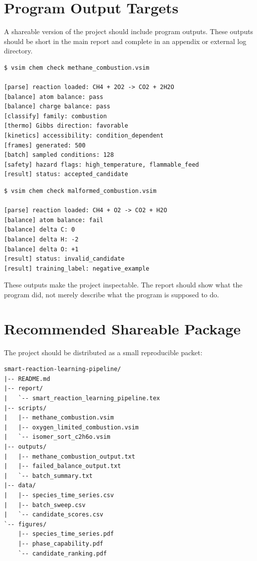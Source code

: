 \documentclass[11pt]{article}
\begin{document}
\section{Program Output Targets}

A shareable version of the project should include program outputs. These outputs should be short in the main report and complete in an appendix or external log directory.

\begin{lstlisting}[caption={Example CLI output for a successful transition check}]
$ vsim chem check methane_combustion.vsim

[parse] reaction loaded: CH4 + 2O2 -> CO2 + 2H2O
[balance] atom balance: pass
[balance] charge balance: pass
[classify] family: combustion
[thermo] Gibbs direction: favorable
[kinetics] accessibility: condition_dependent
[frames] generated: 500
[batch] sampled conditions: 128
[safety] hazard flags: high_temperature, flammable_feed
[result] status: accepted_candidate
\end{lstlisting}

\begin{lstlisting}[caption={Example CLI output for a failed candidate}]
$ vsim chem check malformed_combustion.vsim

[parse] reaction loaded: CH4 + O2 -> CO2 + H2O
[balance] atom balance: fail
[balance] delta C: 0
[balance] delta H: -2
[balance] delta O: +1
[result] status: invalid_candidate
[result] training_label: negative_example
\end{lstlisting}

These outputs make the project inspectable. The report should show what the program did, not merely describe what the program is supposed to do.

\section{Recommended Shareable Package}

The project should be distributed as a small reproducible packet:

\begin{lstlisting}[caption={Recommended shareable directory layout}]
smart-reaction-learning-pipeline/
|-- README.md
|-- report/
|   `-- smart_reaction_learning_pipeline.tex
|-- scripts/
|   |-- methane_combustion.vsim
|   |-- oxygen_limited_combustion.vsim
|   `-- isomer_sort_c2h6o.vsim
|-- outputs/
|   |-- methane_combustion_output.txt
|   |-- failed_balance_output.txt
|   `-- batch_summary.txt
|-- data/
|   |-- species_time_series.csv
|   |-- batch_sweep.csv
|   `-- candidate_scores.csv
`-- figures/
    |-- species_time_series.pdf
    |-- phase_capability.pdf
    `-- candidate_ranking.pdf
\end{lstlisting}
\end{document}
